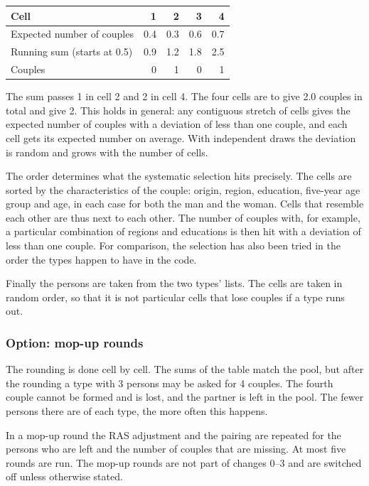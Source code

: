 \documentclass[12pt,a4paper]{article}
\begin{document}
\begin{center}
\begin{tabular}{@{}lrrrr@{}}
\toprule
Cell & 1 & 2 & 3 & 4 \\
\midrule
Expected number of couples & 0.4 & 0.3 & 0.6 & 0.7 \\
Running sum (starts at 0.5) & 0.9 & 1.2 & 1.8 & 2.5 \\
Couples & 0 & 1 & 0 & 1 \\
\bottomrule
\end{tabular}
\end{center}

The sum passes 1 in cell 2 and 2 in cell 4. The four cells are to give 2.0 couples in total and
give 2. This holds in general: any contiguous stretch of cells gives the expected number of couples
with a deviation of less than one couple, and each cell gets its expected number on average. With
independent draws the deviation is random and grows with the number of cells.

The order determines what the systematic selection hits precisely. The cells are sorted by the
characteristics of the couple: origin, region, education, five-year age group and age, in each case
for both the man and the woman. Cells that resemble each other are thus next to each other. The
number of couples with, for example, a particular combination of regions and educations is then hit
with a deviation of less than one couple. For comparison, the selection has also been tried in the
order the types happen to have in the code.

Finally the persons are taken from the two types' lists. The cells are taken in random order, so
that it is not particular cells that lose couples if a type runs out.

\subsubsection*{Option: mop-up rounds}

The rounding is done cell by cell. The sums of the table match the pool, but after the rounding a
type with 3 persons may be asked for 4 couples. The fourth couple cannot be formed and is lost, and
the partner is left in the pool. The fewer persons there are of each type, the more often this
happens.

In a mop-up round the RAS adjustment and the pairing are repeated for the persons who are left and
the number of couples that are missing. At most five rounds are run. The mop-up rounds are not part
of changes 0--3 and are switched off unless otherwise stated.
\end{document}
